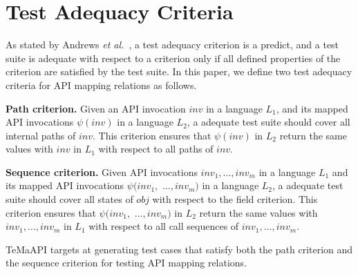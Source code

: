 \section{Test Adequacy Criteria}
\label{sec:mapping}
As stated by Andrews \emph{et al.}~\cite{andrews2003test}, a test adequacy criterion is a predict, and a test suite is adequate with respect to a criterion only if all defined properties of the criterion are satisfied by the test suite. In this paper, we define two test adequacy criteria for API mapping relations as follows.

\textbf{Path criterion.} Given an API invocation $inv$ in a language $L_1$, and its mapped API invocations $\psi(inv)$ in a language $L_2$, a adequate test suite should cover all internal paths of $inv$. This criterion ensures that  $\psi(inv)$ in $L_2$ return the same values with $inv$ in $L_1$ with respect to all paths of $inv$.

\textbf{Sequence criterion.} Given API invocations $inv_{1},\ldots,inv_{m}$ in a language $L_1$ and its mapped API invocations $\psi(inv_{1},$ $\ldots,inv_{m})$ in a language $L_2$, a adequate test suite should cover all states of $obj$ with respect to the field criterion. This criterion ensures that  $\psi(inv_{1},$ $\ldots,inv_{m})$ in $L_2$ return the same values with $inv_{1},\ldots,inv_{m}$ in $L_1$ with respect to all call sequences of $inv_{1},\ldots,inv_{m}$.

TeMaAPI targets at generating test cases that satisfy both the path criterion and the sequence criterion for testing API mapping relations.
